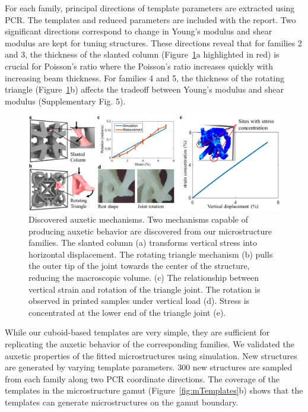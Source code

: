 For each family, principal directions of template parameters are extracted using PCR. The templates and reduced parameters are included with the report. Two significant directions correspond to change in Young's modulus and shear modulus are kept for tuning structures. These directions reveal that for families 2 and 3, the thickness of the slanted column (Figure~\ref{fig:auxeticMech}a highlighted in red) is crucial for Poisson's ratio where the Poisson's ratio increases quickly with increasing beam thickness. For families 4 and 5, the thickness of the rotating triangle (Figure~\ref{fig:auxeticMech}b) affects the tradeoff between Young's modulus and shear modulus (Supplementary Fig. 5).
\begin{figure}
\includegraphics[width=\columnwidth]{images/auxeticMech.png}
\caption{Discovered auxetic mechanisms. Two mechanisms capable of producing auxetic behavior are discovered from our microstructure families. The slanted column (a) transforms vertical stress into horizontal displacement. The rotating triangle mechanism (b) pulls the outer tip of the joint towards the center of the structure, reducing the macroscopic volume. (c) The relationship between vertical strain and rotation of the triangle joint. The rotation is observed in printed samples under vertical load (d). Stress is concentrated at the lower end of the triangle joint (e).}
\label{fig:auxeticMech}
\end{figure}
While our cuboid-based templates are very simple, they are sufficient for replicating the auxetic behavior of the corresponding families.
We validated the auxetic properties of the fitted microstructures using simulation.
New structures are generated by varying template parameters.
300 new structures are sampled from each family along two PCR coordinate directions.
The coverage of the templates in the microstructure gamut (Figure~\ref{fig:mTemplates}b) shows that the templates can generate microstructures on the gamut boundary.

